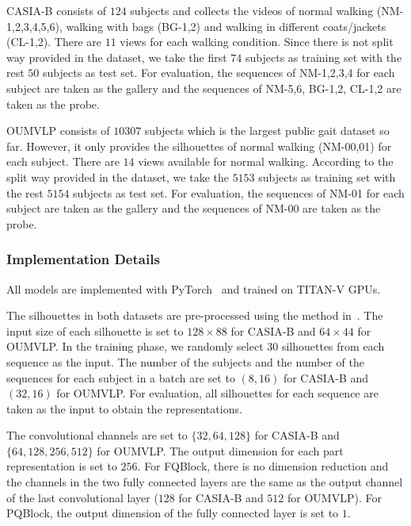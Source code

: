CASIA-B consists of $124$ subjects and collects the videos of normal walking (NM-1,2,3,4,5,6), walking with bags (BG-1,2) and walking in different coats/jackets (CL-1,2).
%
There are $11$ views for each walking condition.
%
Since there is not split way provided in the dataset, we take the first $74$ subjects as training set with the rest $50$ subjects as test set.
%
For evaluation, the sequences of NM-1,2,3,4 for each subject are taken as the gallery and the sequences of NM-5,6, BG-1,2, CL-1,2 are taken as the probe.

OUMVLP consists of $10307$ subjects which is the largest public gait dataset so far.
%
However, it only provides the silhouettes of normal walking (NM-00,01) for each subject.
%
There are $14$ views available for normal walking.
%
According to the split way provided in the dataset, we take the $5153$ subjects as training set with the rest $5154$ subjects as test set.
%
For evaluation, the sequences of NM-01 for each subject are taken as the gallery and the sequences of NM-00 are taken as the probe.

\subsubsection{Implementation Details}
All models are implemented with PyTorch~\cite{NeurIPS2019_9015} and trained on TITAN-V GPUs.

The silhouettes in both datasets are pre-processed using the method in~\cite{takemura2017input}.
%
The input size of each silhouette is set to $128 \times 88$ for CASIA-B and $64 \times 44$ for OUMVLP.
%
In the training phase, we randomly select $30$ silhouettes from each sequence as the input.
%
The number of the subjects and the number of the sequences for each subject in a batch are set to $(8, 16)$ for CASIA-B and $(32, 16)$ for OUMVLP.
%
For evaluation, all silhouettes for each sequence are taken as the input to obtain the representations.

The convolutional channels are set to $\{32, 64, 128\}$ for CASIA-B and $\{64, 128, 256, 512\}$ for OUMVLP.
%
The output dimension for each part representation is set to $256$.
%
For FQBlock, there is no dimension reduction and the channels in the two fully connected layers are the same as the output channel of the last convolutional layer ($128$ for CASIA-B and $512$ for OUMVLP).
%
For PQBlock, the output dimension of the fully connected layer is set to $1$.

